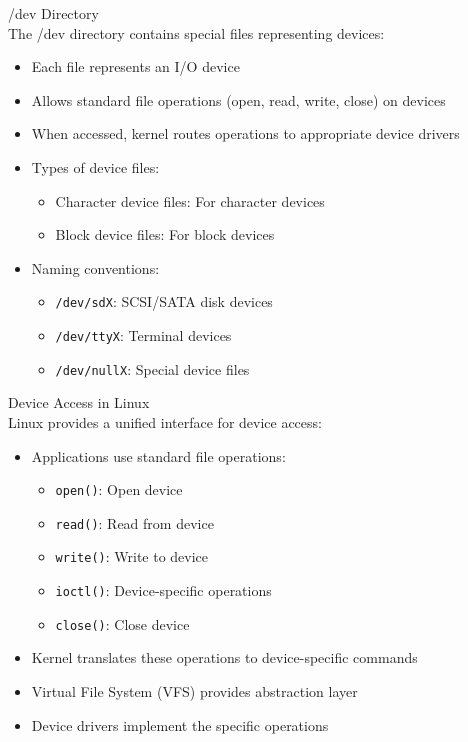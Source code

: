 \begin{definition}{/dev Directory}\\
    The /dev directory contains special files representing devices:
    \begin{itemize}
        \item Each file represents an I/O device
        \item Allows standard file operations (open, read, write, close) on devices
        \item When accessed, kernel routes operations to appropriate device drivers
        \item Types of device files:
            \begin{itemize}
                \item Character device files: For character devices
                \item Block device files: For block devices
            \end{itemize}
        \item Naming conventions:
            \begin{itemize}
                \item \texttt{/dev/sdX}: SCSI/SATA disk devices
                \item \texttt{/dev/ttyX}: Terminal devices
                \item \texttt{/dev/nullX}: Special device files
            \end{itemize}
    \end{itemize}
\end{definition}

\begin{definition}{Device Access in Linux}\\
    Linux provides a unified interface for device access:
    \begin{itemize}
        \item Applications use standard file operations:
            \begin{itemize}
                \item \texttt{open()}: Open device
                \item \texttt{read()}: Read from device
                \item \texttt{write()}: Write to device
                \item \texttt{ioctl()}: Device-specific operations
                \item \texttt{close()}: Close device
            \end{itemize}
        \item Kernel translates these operations to device-specific commands
        \item Virtual File System (VFS) provides abstraction layer
        \item Device drivers implement the specific operations
    \end{itemize}
\end{definition}


